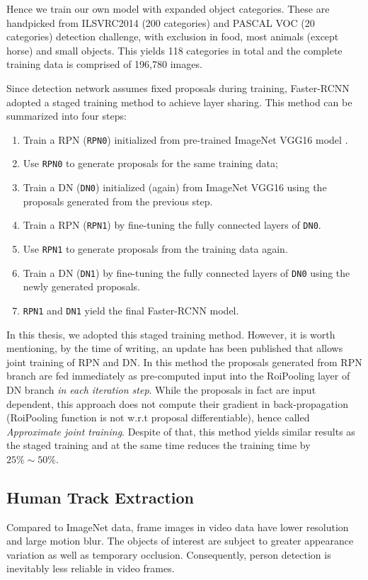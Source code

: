 Hence we train our own model with expanded object categories.
These are handpicked from ILSVRC2014 \cite{ILSVRC15} (200 categories) and PASCAL VOC \cite{pascal-voc-2012} (20 categories) detection challenge, with exclusion in food, most animals (except horse) and small objects.
This yields 118 categories in total and the complete training data is comprised of 196,780 images.

Since detection network assumes fixed proposals during training, Faster-RCNN adopted a staged training method to achieve layer sharing. This method can be summarized into four steps:
\begin{enumerate}
\item Train a RPN (\texttt{RPN0}) initialized from pre-trained ImageNet VGG16 model \cite{simonyan2014very}.
\item Use \texttt{RPN0} to generate proposals for the same training data;
\item Train a DN (\texttt{DN0}) initialized (again) from ImageNet VGG16 using the proposals generated from the previous step.
\item Train a RPN (\texttt{RPN1}) by fine-tuning the fully connected layers of \texttt{DN0}.
\item Use \texttt{RPN1} to generate proposals from the training data again.
\item Train a DN (\texttt{DN1}) by fine-tuning the fully connected layers of \texttt{DN0} using the newly generated proposals.
\item \texttt{RPN1} and \texttt{DN1} yield the final Faster-RCNN model.
\end{enumerate}

In this thesis, we adopted this staged training method. However, it is worth mentioning, by the time of writing, an update has been published that allows joint training of RPN and DN. 
In this method the proposals generated from RPN branch are fed immediately as pre-computed input into the RoiPooling layer of DN branch \textit{in each iteration step}.
While the proposals in fact are input dependent, this approach does not compute their gradient in back-propagation (RoiPooling function is not w.r.t proposal differentiable), hence called \textit{Approximate joint training}.
Despite of that, this method yields similar results as the staged training and at the same time reduces the training time by $ 25\% \sim 50 \%$.
\subsection{Human Track Extraction}\label{sec:humantrack}
Compared to ImageNet data, frame images in video data have lower resolution and large motion blur. The objects of interest are subject to greater appearance variation as well as temporary occlusion.
Consequently, person detection is inevitably less reliable in video frames. 

